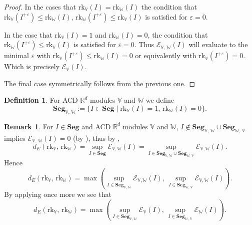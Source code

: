 \documentclass[a4paper,UKenglish,thm-restate]{article}
\theoremstyle{definition}
\newtheorem{definition}[theorem]{Definition}
\newtheorem{remark}[theorem]{Remark}
\begin{document}
            \begin{proof}
                In the cases that $\mathrm{rk}_\mathbb{V}(I)=\mathrm{rk}_\mathbb{W}(I)$ the condition that $\mathrm{rk}_\mathbb{V}(I^{+\varepsilon})\leq \mathrm{rk}_\mathbb{W}(I) ,\, \mathrm{rk}_\mathbb{W}(I^{+\varepsilon})\leq \mathrm{rk}_\mathbb{V}(I)$ is satisfied for $\varepsilon=0$. 

                In the case that $\mathrm{rk}_\mathbb{V}(I)=1$ and $\mathrm{rk}_\mathbb{W}(I)=0$, the condition that $\mathrm{rk}_\mathbb{W}(I^{+\varepsilon})\leq \mathrm{rk}_\mathbb{V}(I)$ is satisfied for $\varepsilon=0$. Thus $\mathcal{E}_{\mathbb{V},\,\mathbb{W}}(I)$ will evaluate to the minimal $\varepsilon$ with $\mathrm{rk}_\mathbb{V}(I^{+\varepsilon})\leq \mathrm{rk}_\mathbb{W}(I)=0$ or equivalently with $\mathrm{rk}_\mathbb{V}(I^{+\varepsilon})=0$. Which is precisely $\mathcal{E}_\mathbb{V}(I)$.

                The final case symmetrically follows from the previous one.
            \end{proof}
            \begin{definition}
                For ACD $\mathbb{R}^d$ modules $\mathbb{V}$ and $\mathbb{W}$ we define \[\mathbf{Seg}_{\mathbb{V},\,\mathbb{W}}:=\{I\in\mathbf{Seg}\;|\;\mathrm{rk}_\mathbb{V}(I)=1,\,\mathrm{rk}_\mathbb{W}(I)=0\}.\]
            \end{definition}
            \begin{remark} \label{dEsymchar}
                For $I\in\mathbf{Seg}$ and ACD $\mathbb{R}^d$ modules 
                $\mathbb{V}$ and $\mathbb{W}$, $I\notin \mathbf{Seg}_{\mathbb{V},\,\mathbb{W}}\cup\mathbf{Seg}_{\mathbb{W},\,\mathbb{V}}$ implies $\mathcal{E}_{\mathbb{V},\,\mathbb{W}}(I)=0$ (by ), thus by ,
                \[d_E(\mathrm{rk}_\mathbb{V},\,\mathrm{rk}_\mathbb{W})=\sup_{I\in\mathbf{Seg}} \mathcal{E}_{\mathbb{V},\mathbb{W}}(I)=\sup_{I\in\mathbf{Seg}_{\mathbb{V},\,\mathbb{W}}\cup\mathbf{Seg}_{\mathbb{W},\,\mathbb{V}}} \mathcal{E}_{\mathbb{V},\mathbb{W}}(I).\]
                Hence
                \[d_E(\mathrm{rk}_\mathbb{V},\,\mathrm{rk}_\mathbb{W})=\max\left(\sup_{I\in\mathbf{Seg}_{\mathbb{V},\,\mathbb{W}}}\mathcal{E}_{\mathbb{V},\mathbb{W}}(I),\,\sup_{I\in\mathbf{Seg}_{\mathbb{W},\,\mathbb{V}}}\mathcal{E}_{\mathbb{V},\mathbb{W}}(I)\right).
                \]
                By applying  once more we see that \[d_E(\mathrm{rk}_\mathbb{V},\,\mathrm{rk}_\mathbb{W})=\max\left(\sup_{I\in\mathbf{Seg}_{\mathbb{V},\,\mathbb{W}}}\mathcal{E}_{\mathbb{V}}(I),\,\sup_{I\in\mathbf{Seg}_{\mathbb{W},\,\mathbb{V}}}\mathcal{E}_{\mathbb{W}}(I)\right).\]
            \end{remark}
\end{document}
